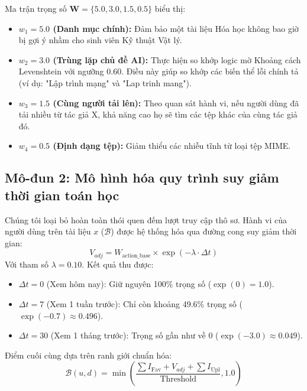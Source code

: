 \documentclass[journal]{IEEEtran}
\begin{document}
Ma trận trọng số $\mathbf{W} = \{5.0, 3.0, 1.5, 0.5\}$ biểu thị:
\begin{itemize}
    \item \textbf{$w_1 = 5.0$ (Danh mục chính):} Đảm bảo một tài liệu Hóa học không bao giờ bị gợi ý nhầm cho sinh viên Kỹ thuật Vật lý.
    \item \textbf{$w_2 = 3.0$ (Trùng lặp chủ đề AI):} Thực hiện so khớp logic mờ Khoảng cách Levenshtein với ngưỡng $0.60$. Điều này giúp so khớp các biến thể lỗi chính tả (ví dụ: "Lập trình mạng" và "Lap trinh mang").
    \item \textbf{$w_3 = 1.5$ (Cùng người tải lên):} Theo quan sát hành vi, nếu người dùng đã tải nhiều từ tác giả X, khả năng cao họ sẽ tìm các tệp khác của cùng tác giả đó.
    \item \textbf{$w_4 = 0.5$ (Định dạng tệp):} Giảm thiểu các nhiễu tĩnh từ loại tệp MIME.
\end{itemize}

\subsection{Mô-đun 2: Mô hình hóa quy trình suy giảm thời gian toán học}

Chúng tôi loại bỏ hoàn toàn thói quen đếm lượt truy cập thô sơ. 
Hành vi của người dùng trên tài liệu $x$ ($\mathcal{B}$) được hệ thống hóa qua đường cong suy giảm thời gian:
\begin{equation}
\label{eq:decay}
V_{adj} = W_{\text{action\_base}} \times \exp(-\lambda \cdot \Delta t)
\end{equation}
Với tham số $\lambda = 0.10$. Kết quả thu được:
\begin{itemize}
    \item $ \Delta t = 0 $ (Xem hôm nay): Giữ nguyên 100\% trọng số ($\exp(0) = 1.0$).
    \item $ \Delta t = 7 $ (Xem 1 tuần trước): Chỉ còn khoảng 49.6\% trọng số ($\exp(-0.7) \approx 0.496$).
    \item $ \Delta t = 30 $ (Xem 1 tháng trước): Trọng số gần như về 0 ($\exp(-3.0) \approx 0.049$).
\end{itemize}

Điểm cuối cùng dựa trên ranh giới chuẩn hóa:
\begin{equation}
\label{eq:behavior_limit}
\mathcal{B}(u,d) = \min\left( \frac{\sum I_{\text{Fav}} + V_{adj} + \sum I_{\text{Upl}}}{\text{Threshold}}, 1.0 \right)
\end{equation}
\end{document}
